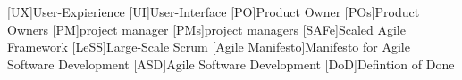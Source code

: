 
\begin{acronym}[HCD]
    [UX]{User-Expierience}
    [UI]{User-Interface}
    [PO]{Product Owner}
    [POs]{Product Owners}
    [PM]{project manager}
    [PMs]{project managers}
    [SAFe]{Scaled Agile Framework}
    [LeSS]{Large-Scale Scrum}
    [Agile Manifesto]{Manifesto for Agile Software Development}
    [ASD]{Agile Software Development}
    [DoD]{Defintion of Done}
\end{acronym}